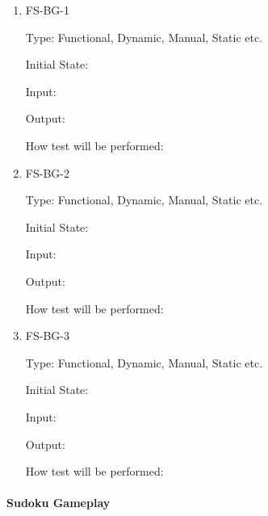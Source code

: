 \documentclass[11pt]{article}
\begin{document}
\begin{enumerate}

\item{FS-BG-1\\}

Type: Functional, Dynamic, Manual, Static etc.
					
Initial State: 
					
Input: 
					
Output: 
					
How test will be performed: 
					
\item{FS-BG-2\\}

Type: Functional, Dynamic, Manual, Static etc.
					
Initial State: 
					
Input: 
					
Output: 
					
How test will be performed: 

\item{FS-BG-3\\}

Type: Functional, Dynamic, Manual, Static etc.
					
Initial State: 
					
Input: 
					
Output: 
					
How test will be performed: 

\end{enumerate}

\paragraph{Sudoku Gameplay}
\end{document}
